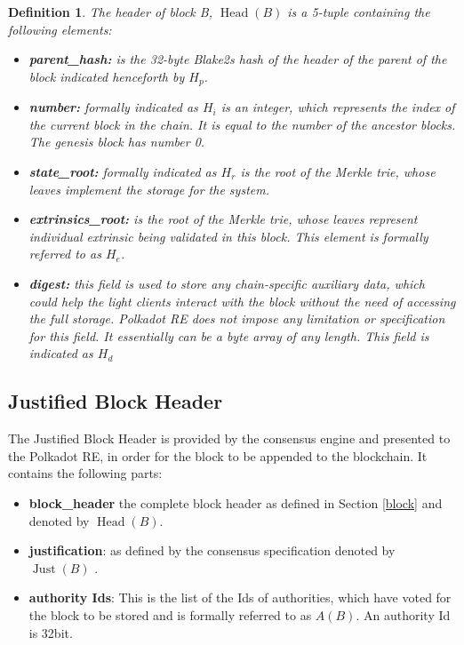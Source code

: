 \documentclass{article}
\newcommand{\tmop}[1]{\ensuremath{\operatorname{#1}}}
\newcommand{\tmsamp}[1]{\textsf{#1}}
\newcommand{\tmstrong}[1]{\textbf{#1}}
\newcommand{\tmtextbf}[1]{{\bfseries{#1}}}
\newtheorem{definition}{Definition}
\begin{document}
\begin{definition}
  \label{def-block-header}The header of block B, $\tmop{Head} (B)$ is a
  5-tuple containing the following elements:
  \begin{itemize}
    \item \tmtextbf{{\tmsamp{parent\_hash:}}} is the 32-byte Blake2s hash of
    the header of the parent of the block indicated henceforth by
    \tmtextbf{$H_p$}.
    
    \item {\tmstrong{{\tmsamp{number:}}}} formally indicated as
    {\tmstrong{$H_i$}} is an integer, which represents the index of the
    current block in the chain. It is equal to the number of the ancestor
    blocks. The genesis block has number 0.
    
    \item {\tmstrong{{\tmsamp{state\_root:}}}} formally indicated as
    {\tmstrong{$H_r$}} is the root of the Merkle trie, whose leaves implement
    the storage for the system.
    
    \item {\tmstrong{{\tmsamp{extrinsics\_root:}}}} is the root of the Merkle
    trie, whose leaves represent individual extrinsic being validated in this
    block. This element is formally referred to as {\tmstrong{$H_e$}}.
    
    \item {\tmstrong{{\tmsamp{digest:}}}} this field is used to store any
    chain-specific auxiliary data, which could help the light clients interact
    with the block without the need of accessing the full storage. Polkadot RE
    does not impose any limitation or specification for this field. It
    essentially can be a byte array of any length. This field is indicated as
    {\tmstrong{$H_d$}}
  \end{itemize}
\end{definition}

\subsection{Justified Block Header}

The Justified Block Header is provided by the consensus engine and presented
to the Polkadot RE, in order for the block to be appended to the blockchain.
It contains the following parts:
\begin{itemize}
  \item {\tmstrong{{\tmsamp{{\tmstrong{block\_header}}}}}} the complete block
  header as defined in Section \ref{block} and denoted by $\tmop{Head} (B)$.
  
  \item {\tmstrong{{\tmsamp{justification}}}}: as defined by the consensus
  specification denoted by $\tmop{Just} (B)$ {}.
  
  \item {\tmstrong{{\tmsamp{authority Ids}}}}: This is the list of the Ids of
  authorities, which have voted for the block to be stored and is formally
  referred to as $A (B)$. An authority Id is 32bit.
\end{itemize}
\end{document}
